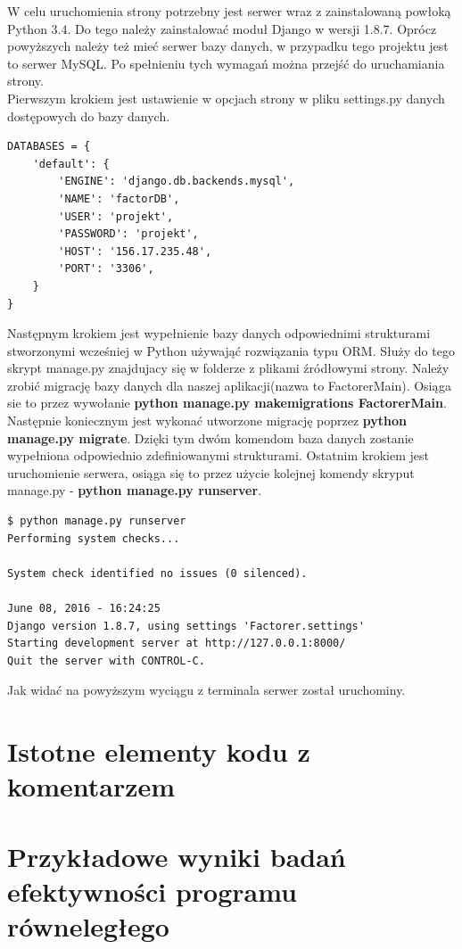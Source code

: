 \documentclass{article}
\begin{document}
W celu uruchomienia strony potrzebny jest serwer wraz z zainstalowaną powłoką Python 3.4. Do tego należy zainstalować moduł Django w wersji 1.8.7. Oprócz powyższych należy też mieć serwer bazy danych, w przypadku tego projektu jest to serwer MySQL. Po spełnieniu tych wymagań można przejść do uruchamiania strony.\\

Pierwszym krokiem jest ustawienie w opcjach strony w pliku settings.py danych dostępowych do bazy danych.
\begin{lstlisting}
DATABASES = {
    'default': {
        'ENGINE': 'django.db.backends.mysql',
        'NAME': 'factorDB',
        'USER': 'projekt',
        'PASSWORD': 'projekt',
        'HOST': '156.17.235.48',
        'PORT': '3306',
    }
}
\end{lstlisting}

Następnym krokiem jest wypełnienie bazy danych odpowiednimi strukturami stworzonymi wcześniej w Python używająć rozwiązania typu ORM. Służy do tego skrypt manage.py znajdujacy się w folderze z plikami źródłowymi strony. Należy zrobić migrację bazy danych dla naszej aplikacji(nazwa to FactorerMain). Osiąga sie to przez wywołanie \textbf{python manage.py makemigrations FactorerMain}. Następnie koniecznym jest wykonać utworzone migrację poprzez \textbf{python manage.py migrate}. Dzięki tym dwóm komendom baza danych zostanie wypełniona odpowiednio zdefiniowanymi strukturami. Ostatnim krokiem jest uruchomienie serwera, osiąga się to przez użycie kolejnej komendy skryput manage.py - \textbf{python manage.py runserver}.
\begin{lstlisting}
$ python manage.py runserver
Performing system checks...

System check identified no issues (0 silenced).

June 08, 2016 - 16:24:25
Django version 1.8.7, using settings 'Factorer.settings'
Starting development server at http://127.0.0.1:8000/
Quit the server with CONTROL-C.

\end{lstlisting}

Jak widać na powyższym wyciągu z terminala serwer został uruchominy.

\section{Istotne elementy kodu z komentarzem}

\newpage
\section{Przykładowe wyniki badań efektywności programu równeległego}
\end{document}
